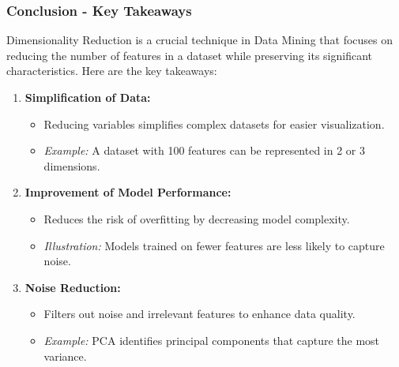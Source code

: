 \documentclass[aspectratio=169]{beamer}
\begin{document}
\begin{frame}[fragile]
    \frametitle{Conclusion - Key Takeaways}

    Dimensionality Reduction is a crucial technique in Data Mining that focuses on reducing the number of features in a dataset while preserving its significant characteristics. Here are the key takeaways:

    \begin{enumerate}
        \item \textbf{Simplification of Data:}
            \begin{itemize}
                \item Reducing variables simplifies complex datasets for easier visualization.
                \item \textit{Example:} A dataset with 100 features can be represented in 2 or 3 dimensions.
            \end{itemize}
        
        \item \textbf{Improvement of Model Performance:}
            \begin{itemize}
                \item Reduces the risk of overfitting by decreasing model complexity.
                \item \textit{Illustration:} Models trained on fewer features are less likely to capture noise.
            \end{itemize}
        
        \item \textbf{Noise Reduction:}
            \begin{itemize}
                \item Filters out noise and irrelevant features to enhance data quality.
                \item \textit{Example:} PCA identifies principal components that capture the most variance.
            \end{itemize}
    \end{enumerate}
\end{frame}
\end{document}
